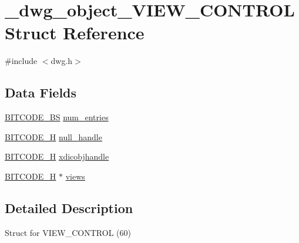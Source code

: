 \hypertarget{struct__dwg__object__VIEW__CONTROL}{\section{\-\_\-dwg\-\_\-object\-\_\-\-V\-I\-E\-W\-\_\-\-C\-O\-N\-T\-R\-O\-L \-Struct \-Reference}
\label{struct__dwg__object__VIEW__CONTROL}
}


{\ttfamily \#include $<$dwg.\-h$>$}

\subsection*{\-Data \-Fields}
\begin{DoxyCompactItemize}
\item 
\hyperlink{dwg_8h_a94297606fbd4a4ff97e8add284af0809}{\-B\-I\-T\-C\-O\-D\-E\-\_\-\-B\-S} \hyperlink{struct__dwg__object__VIEW__CONTROL_a68f2eaeb7bbb85d941b2b292da66503b}{num\-\_\-entries}
\item 
\hyperlink{dwg_8h_a7c700e94e047a97ba8c24bdfe4029dc3}{\-B\-I\-T\-C\-O\-D\-E\-\_\-\-H} \hyperlink{struct__dwg__object__VIEW__CONTROL_a5073255ea0877f2039e2da6fdf035bec}{null\-\_\-handle}
\item 
\hyperlink{dwg_8h_a7c700e94e047a97ba8c24bdfe4029dc3}{\-B\-I\-T\-C\-O\-D\-E\-\_\-\-H} \hyperlink{struct__dwg__object__VIEW__CONTROL_ae25699d3e852215faa9a7c4a692fbb3a}{xdicobjhandle}
\item 
\hyperlink{dwg_8h_a7c700e94e047a97ba8c24bdfe4029dc3}{\-B\-I\-T\-C\-O\-D\-E\-\_\-\-H} $\ast$ \hyperlink{struct__dwg__object__VIEW__CONTROL_a988eb023177e243536a7975709b356c9}{views}
\end{DoxyCompactItemize}


\subsection{\-Detailed \-Description}
\-Struct for \-V\-I\-E\-W\-\_\-\-C\-O\-N\-T\-R\-O\-L (60) 


